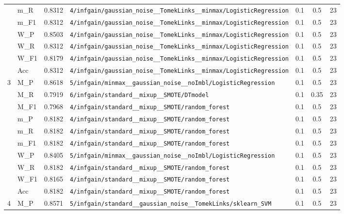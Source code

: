 \begin{table}[htbp]
\begin{tabular}{|c|l|c|>{\ttfamily\footnotesize}p{7.2cm}|c|c|c|}
 & m\_R & 0.8312 & \texttt{4/infgain/gaussian\_noise\_\_TomekLinks\_\_minmax/LogisticRegression} & 0.1 & 0.5  & 23 \\ 
 & m\_F1 & 0.8312 & \texttt{4/infgain/gaussian\_noise\_\_TomekLinks\_\_minmax/LogisticRegression} & 0.1 & 0.5  & 23 \\ 
 & W\_P & 0.8503 & \texttt{4/infgain/gaussian\_noise\_\_TomekLinks\_\_minmax/LogisticRegression} & 0.1 & 0.5  & 23 \\ 
 & W\_R & 0.8312 & \texttt{4/infgain/gaussian\_noise\_\_TomekLinks\_\_minmax/LogisticRegression} & 0.1 & 0.5  & 23 \\ 
 & W\_F1 & 0.8179 & \texttt{4/infgain/gaussian\_noise\_\_TomekLinks\_\_minmax/LogisticRegression} & 0.1 & 0.5  & 23 \\ 
 & Acc & 0.8312 & \texttt{4/infgain/gaussian\_noise\_\_TomekLinks\_\_minmax/LogisticRegression} & 0.1 & 0.5  & 23 \\ 
\hline
\multirow{10}{*}{3} & M\_P & 0.8618 & \texttt{5/infgain/minmax\_\_gaussian\_noise\_\_noImbl/LogisticRegression} & 0.1 & 0.5  & 23 \\ 
 & M\_R & 0.7919 & \texttt{6/infgain/standard\_\_mixup\_\_SMOTE/DTmodel} & 0.1 & 0.35  & 23 \\ 
 & M\_F1 & 0.7968 & \texttt{4/infgain/standard\_\_mixup\_\_SMOTE/random\_forest} & 0.1 & 0.5  & 23 \\ 
 & m\_P & 0.8182 & \texttt{4/infgain/standard\_\_mixup\_\_SMOTE/random\_forest} & 0.1 & 0.5  & 23 \\ 
 & m\_R & 0.8182 & \texttt{4/infgain/standard\_\_mixup\_\_SMOTE/random\_forest} & 0.1 & 0.5  & 23 \\ 
 & m\_F1 & 0.8182 & \texttt{4/infgain/standard\_\_mixup\_\_SMOTE/random\_forest} & 0.1 & 0.5  & 23 \\ 
 & W\_P & 0.8405 & \texttt{5/infgain/minmax\_\_gaussian\_noise\_\_noImbl/LogisticRegression} & 0.1 & 0.5  & 23 \\ 
 & W\_R & 0.8182 & \texttt{4/infgain/standard\_\_mixup\_\_SMOTE/random\_forest} & 0.1 & 0.5  & 23 \\ 
 & W\_F1 & 0.8165 & \texttt{4/infgain/standard\_\_mixup\_\_SMOTE/random\_forest} & 0.1 & 0.5  & 23 \\ 
 & Acc & 0.8182 & \texttt{4/infgain/standard\_\_mixup\_\_SMOTE/random\_forest} & 0.1 & 0.5  & 23 \\ 
\hline
\multirow{10}{*}{4} & M\_P & 0.8571 & \texttt{5/infgain/standard\_\_gaussian\_noise\_\_TomekLinks/sklearn\_SVM} & 0.1 & 0.5  & 23 \\ 

\end{tabular}
\end{table}
